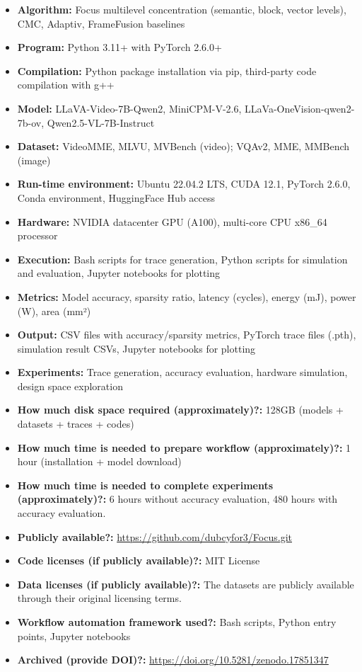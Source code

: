 {\small
\begin{itemize}
  \item {\bf Algorithm: } Focus multilevel concentration (semantic, block, vector levels), CMC, Adaptiv, FrameFusion baselines
  \item {\bf Program: } Python 3.11+ with PyTorch 2.6.0+
  \item {\bf Compilation: } Python package installation via pip, third-party code compilation with g++
  \item {\bf Model: } LLaVA-Video-7B-Qwen2, MiniCPM-V-2.6, LLaVa-OneVision-qwen2-7b-ov, Qwen2.5-VL-7B-Instruct
  \item {\bf Dataset: } VideoMME, MLVU, MVBench (video); VQAv2, MME, MMBench (image)
  \item {\bf Run-time environment: } Ubuntu 22.04.2 LTS, CUDA 12.1, PyTorch 2.6.0, Conda environment, HuggingFace Hub access
  \item {\bf Hardware: } NVIDIA datacenter GPU (A100), multi-core CPU x86\_64 processor
  \item {\bf Execution: } Bash scripts for trace generation, Python scripts for simulation and evaluation, Jupyter notebooks for plotting
  \item {\bf Metrics: } Model accuracy, sparsity ratio, latency (cycles), energy (mJ), power (W), area (mm²)
  \item {\bf Output: } CSV files with accuracy/sparsity metrics, PyTorch trace files (.pth), simulation result CSVs, Jupyter notebooks for plotting
  \item {\bf Experiments: } Trace generation, accuracy evaluation, hardware simulation, design space exploration
  \item {\bf How much disk space required (approximately)?: } 128GB (models + datasets + traces + codes)
  \item {\bf How much time is needed to prepare workflow (approximately)?: } 1 hour (installation + model download)
  \item {\bf How much time is needed to complete experiments (approximately)?: } 6 hours without accuracy evaluation, 480 hours with accuracy evaluation.
  \item {\bf Publicly available?: } \href{https://github.com/dubcyfor3/Focus.git}{https://github.com/dubcyfor3/Focus.git}
  \item {\bf Code licenses (if publicly available)?: } MIT License
  \item {\bf Data licenses (if publicly available)?: } The datasets are publicly available through their original licensing terms.
  \item {\bf Workflow automation framework used?: } Bash scripts, Python entry points, Jupyter notebooks
  \item {\bf Archived (provide DOI)?: } \href{https://doi.org/10.5281/zenodo.17851347}{https://doi.org/10.5281/zenodo.17851347}
\end{itemize}
}

